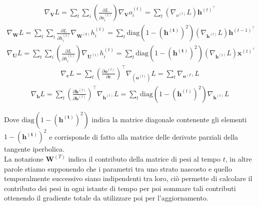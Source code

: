 \documentclass[../../main.tex]{subfiles}
\begin{document}
\begin{fleqn}[0cm]
    \begin{align}
        \nabla_{\boldsymbol{V}}L = \sum_t \sum_i \left(\frac{\partial L}{\partial o_i^{(t)}}\right) \nabla_{\boldsymbol{V}}o_i^{(t)} = \sum_t (\nabla_{o^{(t)}}L) \boldsymbol{h}^{(t)^\top}
    \end{align}
    \begin{align}
        \nabla_{\boldsymbol{W}}L = \sum_t \sum_i \frac{\partial L}{\partial h_i^{(t)}} \nabla_{\boldsymbol{W^{(t)}}} h_i^{(t)} = \sum_t \text{diag} \left(1 - (\boldsymbol{h^{(t)}})^2\right) (\nabla_{\boldsymbol{h}^{(t)}}L)\boldsymbol{h}^{(t-1)^\top}
    \end{align}
    \begin{align}
        \nabla_{\boldsymbol{U}}L = \sum_t \sum_i \left(\frac{\partial L}{\partial h_i^{(t)}}\right) \nabla_{\boldsymbol{U}^{(t)}}h_i^{(t)} = \sum_t \text{diag} \left(1 - (\boldsymbol{h^{(t)}})^2\right) (\nabla_{\boldsymbol{h}^{(t)}}L )\boldsymbol{x}^{(t)^\top}
    \end{align}
    \begin{align}
        \nabla_{\boldsymbol{c}}L = \sum_t \left(\frac{\partial \boldsymbol{o}^{(t)}}{\partial \boldsymbol{c}}\right)^\top \nabla_{(\boldsymbol{o}^{(t)})}L = \sum_t \nabla_{\boldsymbol{o}^{(T)}} L
    \end{align}
    \begin{align}
        \nabla_{\boldsymbol{b}}L = \sum_t \left(\frac{\partial \boldsymbol{h}^{(t)}}{\partial \boldsymbol{b}^{(t)}}\right)^\top \nabla_{\boldsymbol{h}^{(t)}} L = \sum_t \text{diag}\left(1 - (\boldsymbol{h}^{(t)})^2\right)\nabla_{\boldsymbol{h}^{(t)}}L
    \end{align}
\end{fleqn}
Dove $\text{diag} \left(1 - (\boldsymbol{h^{(t)}})^2\right)$ indica la matrice diagonale contenente gli elementi $1 - (\boldsymbol{h^{(t)}})^2$ e corrisponde di fatto alla matrice delle derivate parziali della tangente iperbolica.\\
La notazione $\boldsymbol{W}^{(T)}$ indica il contributo della matrice di pesi al tempo $t$, in altre parole stiamo supponendo che i parametri tra uno strato nascosto e quello temporalmente successivo siano indipendenti tra loro, ciò permette di calcolare il contributo dei pesi in ogni istante di tempo per poi sommare tali contributi ottenendo il gradiente totale da utilizzare poi per l'aggiornamento.
\end{document}
